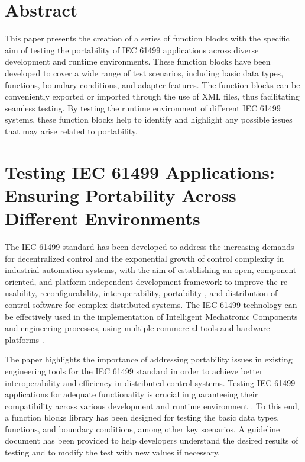 \begin{bibunit}
\thispagestyle{plain}

\newcommand{\RNum}[1]{\uppercase\expandafter{\romannumeral #1\relax}}


\section*{Abstract}

    This paper presents the creation of a series of function blocks with the specific aim of testing the portability of IEC 61499 applications across diverse development and runtime environments. These function blocks have been developed to cover a wide range of test scenarios, including basic data types, functions, boundary conditions, and adapter features. The function blocks can be conveniently exported or imported through the use of XML files, thus facilitating seamless testing. By testing the runtime environment of different IEC 61499 systems, these function blocks help to identify and highlight any possible issues that may arise related to portability.
    
    
\section{Testing IEC 61499 Applications: Ensuring Portability Across Different Environments}

The IEC 61499 standard \cite{iec61499part12012} has been developed to address the increasing demands for decentralized control and the exponential growth of control complexity in industrial automation systems, with the aim of establishing an open, component-oriented, and platform-independent development framework to improve the re-usability, reconfigurability, interoperability, portability \cite{gerber2010does}, and distribution of control software for complex distributed systems. The IEC 61499 technology can be effectively used in the implementation of Intelligent Mechatronic Components and engineering processes, using multiple commercial tools and hardware platforms \cite{patil2013composition}. 

The paper \cite{pang2014portability} highlights the importance of addressing portability issues in existing engineering tools for the IEC 61499 standard in order to achieve better interoperability and efficiency in distributed control systems. Testing IEC 61499 applications for adequate functionality is crucial in guaranteeing their compatibility across various development and runtime environment \cite{hopsu2019portability}. To this end, a function blocks library has been designed for testing the basic data types, functions, and boundary conditions, among other key scenarios. A guideline document has been provided to help developers understand the desired results of testing and to modify the test with new values if necessary. 


\end{bibunit}
